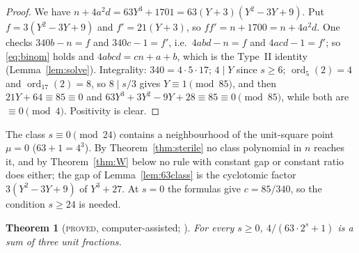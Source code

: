 \documentclass[11pt,reqno]{amsart}
\newtheorem{theorem}{Theorem}[section]
\theoremstyle{definition}
\newcommand{\ord}{\operatorname{ord}}
\newcommand{\status}[1]{\textup{\textsc{#1}}}
\begin{document}
\begin{proof}
We have $n+4a^2d=63Y^3+1701=63(Y+3)(Y^2-3Y+9)$.  Put $f=3(Y^2-3Y+9)$ and
$f'=21(Y+3)$, so $ff'=n+1700=n+4a^2d$.  One checks $340b-n=f$ and
$340c-1=f'$, i.e.\ $4abd-n=f$ and $4acd-1=f'$; so \eqref{eq:binom} holds
and $4abcd=cn+a+b$, which is the Type~II identity
(Lemma~\ref{lem:solve}).  Integrality: $340=4\cdot5\cdot17$; $4\mid Y$ since
$s\ge6$; $\ord_5(2)=4$ and $\ord_{17}(2)=8$, so $8\mid s/3$ gives
$Y\equiv1\pmod{85}$, and then $21Y+64\equiv85\equiv0$ and
$63Y^3+3Y^2-9Y+28\equiv85\equiv0\pmod{85}$, while both are $\equiv0\pmod4$.
Positivity is clear.
\end{proof}

The class $s\equiv0\pmod{24}$ contains a neighbourhood of the unit-square
point $\mu=0$ ($63+1=4^3$).  By Theorem~\ref{thm:sterile} no class polynomial
in $n$ reaches it, and by Theorem~\ref{thm:W} below no rule with constant
gap or constant ratio does either; the gap of Lemma~\ref{lem:63class} is the
cyclotomic factor $3(Y^2-3Y+9)$ of $Y^3+27$.  At $s=0$ the formulas give
$c=85/340$, so the condition $s\ge24$ is needed.

\begin{theorem}[\status{proved}, computer-assisted; {\cite[Thm.~3.1]{ExpOpen}}]\label{thm:63}
For every $s\ge0$, $4/(63\cdot2^s+1)$ is a sum of three unit fractions.
\end{theorem}
\end{document}
